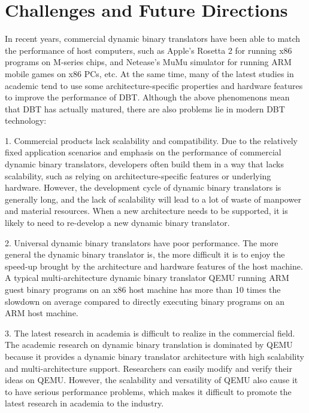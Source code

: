 \section{Challenges and Future Directions}
\label{sec:comments}

In recent years, commercial dynamic binary translators have been able to match the performance of host computers, such as Apple's Rosetta 2 for running x86 programs on M-series chips, and Netease's MuMu simulator for running ARM mobile games on x86 PCs, etc.
At the same time, many of the latest studies in academic tend to use some architecture-specific properties and hardware features to improve the performance of DBT.
Although the above phenomenons mean that DBT has actually matured, there are also problems lie in modern DBT technology:

1. Commercial products lack scalability and compatibility.
Due to the relatively fixed application scenarios and emphasis on the performance of commercial dynamic binary translators, developers often build them in a way that lacks scalability, such as relying on architecture-specific features or underlying hardware.
However, the development cycle of dynamic binary translators is generally long, and the lack of scalability will lead to a lot of waste of manpower and material resources.
When a new architecture needs to be supported, it is likely to need to re-develop a new dynamic binary translator.

2. Universal dynamic binary translators have poor performance.
The more general the dynamic binary translator is, the more difficult it is to enjoy the speed-up brought by the architecture and hardware features of the host machine.
A typical multi-architecture dynamic binary translator QEMU running ARM guest binary programs on an x86 host machine has more than 10 times the slowdown on average compared to directly executing binary programs on an ARM host machine.

3. The latest research in academia is difficult to realize in the commercial field.
The academic research on dynamic binary translation is dominated by QEMU because it provides a dynamic binary translator architecture with high scalability and multi-architecture support.
Researchers can easily modify and verify their ideas on QEMU.
However, the scalability and versatility of QEMU also cause it to have serious performance problems, which makes it difficult to promote the latest research in academia to the industry.

